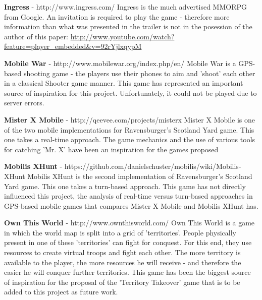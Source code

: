 \documentclass{article}
\begin{document}
\textbf{Ingress} - http://www.ingress.com/ \newline
Ingress is the much advertised MMORPG from Google. An invitation is required to
play the game - therefore more information than what was presented in the
trailer is not in the posession of the author of this paper:\newline
\url{http://www.youtube.com/watch?feature=player_embedded&v=92rYjlxqypM}\newline

\textbf{Mobile War} - http://www.mobilewar.org/index.php/en/ \newline
Mobile War is a GPS-based shooting game - the players use their phones to aim
and 'shoot' each other in a classical Shooter game manner. This game has
represented an important source of inspiration for this project.
Unfortunately, it could not be played due to server errors.\newline

\textbf{Mister X Mobile} - http://qeevee.com/projects/misterx \newline
Mister X Mobile is one of the two mobile implementations for Ravensburger's
Scotland Yard game. This one takes a real-time approach. The game mechanics and
the use of various tools for catching 'Mr. X' have been an inspiration for the
games proposed\newline

\textbf{Mobilis XHunt} - https://github.com/danielschuster/mobilis/wiki/Mobilis-XHunt
\newline
Mobilis XHunt is the second implementation of Ravensburger's Scotland Yard game.
This one takes a turn-based approach. This game has not directly influenced this
project, the analysis\cite{rttvsrts2} of real-time versus turn-based approaches in
GPS-based mobile games that compares Mister X Mobile and Mobilis XHunt has.\newline

\textbf{Own This World} - http://www.ownthisworld.com/ \newline
Own This World is a game in which the world map is split into a grid of
'territories'. People physically present in one of these 'territories' can fight
for conquest. For this end, they use resources to create virtual troops and
fight each other. The more territory is available to the player, the more
resources he will receive - and therefore the easier he will conquer further
territories. This game has been the biggest source of inspiration for the
proposal of the 'Territory Takeover' game that is to be added to this project as
future work.\newline
\end{document}
